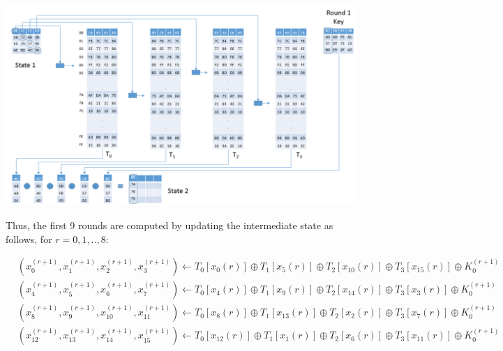 \begin{center}
\includegraphics[scale=0.4,natwidth=1159,natheight=661]{Figures/aes-1-1(new).png}
\label{fig: The diagram shows how $x_0^1,x_1^1,x_2^1,x_3^1$ are computed.}
\end{center}

\begin{flushleft}
Thus, the first 9 rounds are computed by updating the intermediate state as follows, for $r=0,1,..,8$:
\end{flushleft}
\begin{small}
\begin{align*}
&(x_0^{(r+1)},x_1^{(r+1)},x_2^{(r+1)},x_3^{(r+1)}) \gets T_0[x_0{(r)}] \oplus T_1[x_5{(r)}] \oplus T_2[x_{10}{(r)}] \oplus T_3[x_{15}{(r)}] \oplus K_0^{(r+1)}\\
&(x_4^{(r+1)},x_5^{(r+1)},x_6^{(r+1)},x_7^{(r+1)}) \gets T_0[x_4{(r)}] \oplus T_1[x_9{(r)}] \oplus T_2[x_{14}{(r)}] \oplus T_3[x_{3}{(r)}] \oplus K_0^{(r+1)}\\
&(x_8^{(r+1)},x_9^{(r+1)},x_{10}^{(r+1)},x_{11}^{(r+1)}) \gets T_0[x_8{(r)}] \oplus T_1[x_{13}{(r)}] \oplus T_2[x_{2}{(r)}] \oplus T_3[x_{7}{(r)}] \oplus K_0^{(r+1)}\\
&(x_{12}^{(r+1)},x_{13}^{(r+1)},x_{14}^{(r+1)},x_{15}^{(r+1)}) \gets T_0[x_{12}{(r)}] \oplus T_1[x_1{(r)}] \oplus T_2[x_{6}{(r)}] \oplus T_3[x_{11}{(r)}] \oplus K_0^{(r+1)}
\end{align*}
\end{small}

